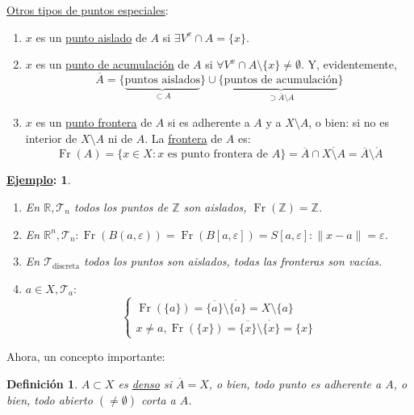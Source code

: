 \documentclass[10pt,a4paper,openright]{book}
\theoremstyle{break}
\newtheorem*{defi}{Definición}
\newtheorem*{ej}{\underline{Ejemplo}:}
\DeclareMathOperator{\fr}{Fr}
\begin{document}
\underline{Otros tipos de puntos especiales}:
\begin{enumerate}
    \item $x$ es un \underline{punto aislado} de $A$ si $\exists V^x \cap A = \{x\}$.
    \item $x$ es un \underline{punto de acumulación} de $A$ si $\forall V^x \cap A \setminus \{x\} \neq \emptyset$. Y, evidentemente,
    \[
    \overline{A} = \{\underbrace{\text{puntos aislados}}_{\subset A}\} \cup \{\underbrace{\text{puntos de acumulación}}_{\supset \overline{A} \setminus A}\} 
    \]
    \item $x$ es un \underline{punto frontera} de $A$ si es adherente a $A$ y a $X \setminus A$, o bien: si no es interior de $X \setminus A$ ni de $A$. La \underline{frontera} de $A$ es: 
    \[
    \fr\left( A \right) = \{x \in X: x \text{ es punto frontera de } A\} = \overline{A} \cap \overline{X \setminus A} = \overline{A} \setminus \mathring{A}     
    \]
\end{enumerate}

\begin{ej}
\begin{enumerate}
    \item En $\mathbb{R}, \mathcal{T}_n$ todos los puntos de $\mathbb{Z}$ son aislados, $\fr\left( \mathbb{Z} \right) = \mathbb{Z}$.
    \item En $\mathbb{R}^n, \mathcal{T}_n: \fr\left( B\left( a, \varepsilon \right) \right) = \fr\left( B\left[ a, \varepsilon \right] \right) = S\left[ a, \varepsilon \right] : \lVert x - a \rVert = \varepsilon$.
    \item En $\mathcal{T}_{\text{discreta}}$ todos los puntos son aislados, todas las fronteras son vacías.
    \item $a \in X, \mathcal{T}_a: $
    \[
    \begin{cases}
        \fr\left( \{a\} \right) = \overline{\{a\}} \setminus \mathring{\{a\}} = X \setminus \{a\}\\
        x \neq a, \fr\left( \{x\} \right) = \overline{\{x\}} \setminus \mathring{\{x\}} = \{x\} 
    \end{cases} 
    \]
\end{enumerate}
\end{ej}

Ahora, un concepto importante:
\begin{defi}
$A \subset X$ es \underline{denso} si $\overline{A} = X$, o bien, todo punto es adherente a $A$, o bien, todo abierto $\left( \neq \emptyset \right)$ corta a $A$.
\end{defi}
\end{document}
